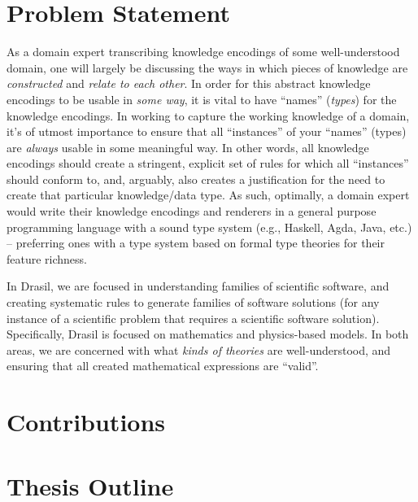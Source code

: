 

\section{Problem Statement}


As a domain expert transcribing knowledge encodings of some well-understood
domain, one will largely be discussing the ways in which pieces of knowledge are
\textit{constructed} and \textit{relate to each other}. In order for this
abstract knowledge encodings to be usable in \textit{some way}, it is vital to
have ``names'' (\textit{types}) for the knowledge encodings. In working to
capture the working knowledge of a domain, it's of utmost importance to ensure
that all ``instances'' of your ``names'' (types) are \textit{always} usable in
some meaningful way. In other words, all knowledge encodings should create a
stringent, explicit set of rules for which all ``instances'' should conform to,
and, arguably, also creates a justification for the need to create that
particular knowledge/data type. As such, optimally, a domain expert would write
their knowledge encodings and renderers in a general purpose programming
language with a sound type system (e.g., Haskell, Agda, Java, etc.) --
preferring ones with a type system based on formal type theories for their
feature richness.

In Drasil, we are focused in understanding families of scientific software, and
creating systematic rules to generate families of software solutions (for any
instance of a scientific problem that requires a scientific software solution).
Specifically, Drasil is focused on mathematics and physics-based models. In both
areas, we are concerned with what \textit{kinds of theories} are
well-understood, and ensuring that all created mathematical expressions are
``valid''. 

\section{Contributions}


\section{Thesis Outline}

